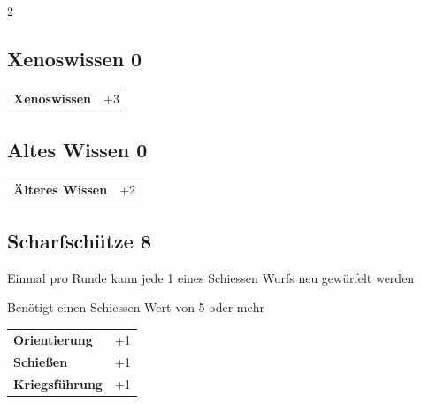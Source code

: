 \begin{multicols}{2}
\begin{tcolorbox}
    \subsection*{Xenoswissen \hfill \small{0 }}
    \tcblower




\begin{tabular}{@{}ll@{}}
    \textbf{Xenoswissen} & +3\\
\end{tabular}


\end{tcolorbox}

\begin{tcolorbox}
    \subsection*{Altes Wissen \hfill \small{0 }}
    \tcblower




\begin{tabular}{@{}ll@{}}
    \textbf{Älteres Wissen} & +2\\
\end{tabular}


\end{tcolorbox}

\begin{tcolorbox}
    \subsection*{Scharfschütze \hfill \small{8 }}
    \tcblower
Einmal pro Runde kann jede 1 eines Schiessen Wurfs neu gewürfelt werden

Benötigt einen Schiessen Wert von 5 oder mehr


\vspace{3mm}

\begin{tabular}{@{}ll@{}}
    \textbf{Orientierung} & +1\\
    \textbf{Schießen} & +1\\
    \textbf{Kriegsführung} & +1\\
\end{tabular}


\end{tcolorbox}
\end{multicols}
